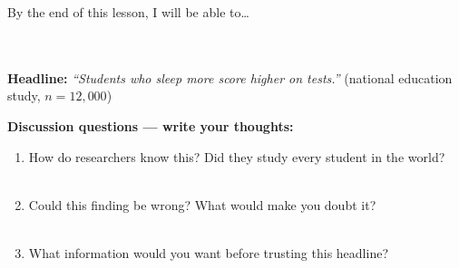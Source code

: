\documentclass[10pt]{article}
\begin{document}
\namedateperiod

\vspace{0.12in}

\begin{objectivebox}
\small By the end of this lesson, I will be able to\dots\\[4pt]
\writeline\\[1pt]
\writeline\\[1pt]
\writeline
\end{objectivebox}

\vspace{0.1in}

\begin{vocabbox}
\end{vocabbox}

\vspace{0.1in}

\begin{hookbox}
\small\textbf{Headline:}\quad
\textit{``Students who sleep more score higher on tests.''}
\hfill\textcolor{slate}{\small(national education study, $n = 12{,}000$)}

\vspace{6pt}
\textbf{Discussion questions — write your thoughts:}
\begin{enumerate}[leftmargin=1.5em, itemsep=2pt]
  \item How do researchers know this? Did they study every student in the world?\\
        \writeline\\[1pt]\writeline

  \item Could this finding be wrong? What would make you doubt it?\\
        \writeline\\[1pt]\writeline

  \item What information would you want before trusting this headline?\\
        \writeline\\[1pt]\writeline
\end{enumerate}
\end{hookbox}
\end{document}
